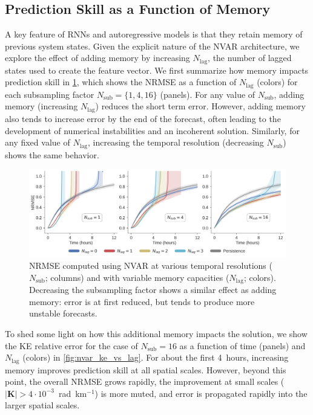 \documentclass[draft]{agujournal2019}
\newcommand{\maxlag}{N_\text{lag}}
\newcommand{\nsub}{N_\text{sub}}
\newcommand{\nlag}{\maxlag}
\begin{document}
\subsection{Prediction Skill as a Function of Memory}
\label{subsec:nvar-memory}

A key feature of RNNs and autoregressive models is that they retain memory of
previous system states.
Given the explicit nature of the NVAR architecture, we explore the effect of
adding memory by increasing $\nlag$, the number of lagged states used to create the
feature vector.
We first summarize how memory impacts prediction skill in
\cref{fig:nvar_nrmse_vs_lag}, which shows the NRMSE as a
function of $\nlag$ (colors) for each
subsampling factor $\nsub = \{1, 4, 16\}$ (panels).
For any value of $\nsub$, adding memory (increasing $\nlag$) reduces
the short term error.
However, adding memory also tends to increase error by the end of the forecast,
often leading to the development of numerical instabilities and an
incoherent solution.
Similarly, for any fixed value of $\nlag$, increasing the temporal resolution
(decreasing $\nsub$) shows the same behavior.

\begin{figure}
    \centering
    \includegraphics[width=\textwidth]{nvar_nrmse_vs_memory.jpg}
    \caption{NRMSE computed using NVAR at various temporal resolutions
        ($\nsub$; columns) and with variable memory capacities ($\nlag$;
        colors).
        Decreasing the subsampling factor shows a similar effect as adding
        memory: error is at first reduced, but tends to produce more unstable
        forecasts.
    }
    \label{fig:nvar_nrmse_vs_lag}
\end{figure}

To shed some light on how this additional memory impacts the solution,
we show the KE relative error
for the case of $\nsub=16$ as a function of time (panels) and $\nlag$ (colors)
in \cref{fig:nvar_ke_vs_lag}.
For about the first 4~hours, increasing memory improves prediction skill at all
spatial scales.
However, beyond this point, the overall NRMSE grows rapidly, the improvement
at small scales ($|\mathbf{K}|>4\cdot10^{-3}$~rad~km$^{-1}$) is more muted,
and error is propagated rapidly into the larger spatial scales.
\end{document}
